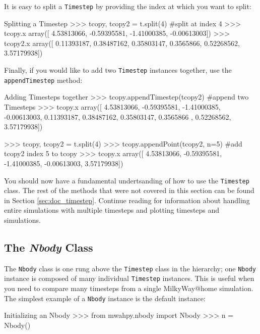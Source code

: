\documentclass{article}
\begin{document}
It is easy to split a \verb!Timestep! by providing the index at which you want to split: \\

\begin{codelisting}{Splitting a Timestep}
>>> tcopy, tcopy2 = t.split(4) #split at index 4
>>> tcopy.x
array([ 4.53813066, -0.59395581, -1.41000385, -0.00613003])
>>> tcopy2.x
array([ 0.11393187,  0.38487162,  0.35803147,  0.3565866,   0.52268562, 
3.57179938])
\end{codelisting}

Finally, if you would like to add two \verb!Timestep! instances together, use the \verb!appendTimestep! method: \\

\begin{codelisting}{Adding Timesteps together}
>>> tcopy.appendTimestep(tcopy2) #append two Timesteps
>>> tcopy.x
array([ 4.53813066, -0.59395581, -1.41000385, -0.00613003,  0.11393187,
        0.38487162,  0.35803147,  0.3565866 ,  0.52268562,  3.57179938])
        
>>> tcopy, tcopy2 = t.split(4)
>>> tcopy.appendPoint(tcopy2, n=5) #add tcopy2 index 5 to tcopy
>>> tcopy.x
array([ 4.53813066, -0.59395581, -1.41000385, -0.00613003,  3.57179938])
\end{codelisting}

You should now have a fundamental undertsanding of how to use the \verb!Timestep! class. The rest of the methods that were not covered in this section can be found in Section \ref{sec:doc_timestep}. Continue reading for information about handling entire simulations with multiple timesteps and plotting timesteps and simulations. 

\subsection{The \textit{Nbody} Class}

The \verb!Nbody! class is one rung above the \verb!Timestep! class in the \mwahpy hierarchy; one \verb!Nbody! instance is composed of many individual \verb!Timestep! instances. This is useful when you need to compare many timesteps from a single MilkyWay@home simulation. The simplest example of a \verb!Nbody! instance is the default instance:\\

\begin{codelisting}{Initializing an Nbody}
>>> from mwahpy.nbody import Nbody
>>> n = Nbody()
\end{codelisting}
\end{document}
